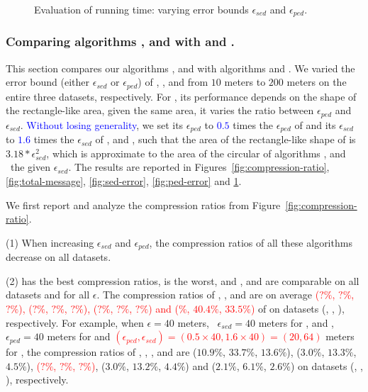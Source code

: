 {\begin{figure}[tb!]
	\vspace{-1ex}
	\caption{\small Evaluation of running time: varying error bounds $\epsilon_{sed}$ and $\epsilon_{ped}$.}
	\label{fig:running-time}
	\vspace{-1ex}
\end{figure}


\subsubsection{Comparing algorithms \bitt, \sitt and \citt with \ldrh and \grts.}
This section compares our algorithms \citt, \sitt and \bitt with algorithms \ldrh and \grts.
We varied the error bound (either $\epsilon_{sed}$ or $\epsilon_{ped}$) of \citt, \sitt, \ldrh and \grts from $10$ meters to $200$ meters on the entire three datasets, respectively. 
{For \bitt, its performance depends on the shape of the rectangle-like area, \ie given the same area, it varies \wrt the ratio between $\epsilon_{ped}$ and $\epsilon_{sed}$. \textcolor{blue}{Without losing generality}, we set its $\epsilon_{ped}$ to \textcolor{blue}{$0.5$} times the $\epsilon_{ped}$ of \sitt and its $\epsilon_{sed}$ to \textcolor{blue}{$1.6$} times the $\epsilon_{sed}$ of \citt, \grts and \ldrh, such that the area of the rectangle-like shape of \bitt is $3.18*\epsilon_{sed}^2$, which is approximate to the area of the circular of algorithms \citt, \ldrh and \grts~\wrt the given $\epsilon_{sed}$.}
%
The results are reported in Figures~\ref{fig:compression-ratio}, \ref{fig:total-message}, \ref{fig:sed-error}, \ref{fig:ped-error} and \ref{fig:running-time}.


 We first report and analyze the compression ratios from Figure~\ref{fig:compression-ratio}.

\ni (1) When increasing $\epsilon_{sed}$ and $\epsilon_{ped}$, the compression ratios of all these algorithms decrease on all datasets.

\ni (2) \sitt has the best compression ratios, \ldrh is the worst, and \grts, \citt and \bitt are comparable on all datasets and for all $\epsilon$.
The compression ratios of \grts, \bitt,  \citt and \sitt are on average \textcolor{red}{($?\%$, $?\%$, $?\%$), ($?\%$, $?\%$, $?\%$), ($?\%$, $?\%$, $?\%$) and ($\%$, $40.4\%$, $33.5\%$)} of \ldrh on datasets (\mopsi, \sercar, \geolife), respectively.
For example, when $\epsilon = 40$ meters, \ie~$\epsilon_{sed} = 40$ meters for \ldrh, \grts and \citt, $\epsilon_{ped} = 40$ meters for \sitt and \textcolor{red}{$(\epsilon_{ped}, \epsilon_{sed}) = (0.5\times 40, 1.6\times 40)=(20, 64)$} meters for \bitt, the compression ratios of \ldrh, \grts, \bitt, \citt and \sitt are
{($10.9\%$, $33.7\%$, $13.6\%$), ($3.0\%$, $13.3\%$, $4.5\%$), \textcolor{red}{($?\%$, $?\%$, $?\%$)}, ($3.0\%$, $13.2\%$, $4.4\%$) and ($2.1\%$, $6.1\%$, $2.6\%$)} on  {datasets (\mopsi, \sercar, \geolife)}, respectively. 

}
